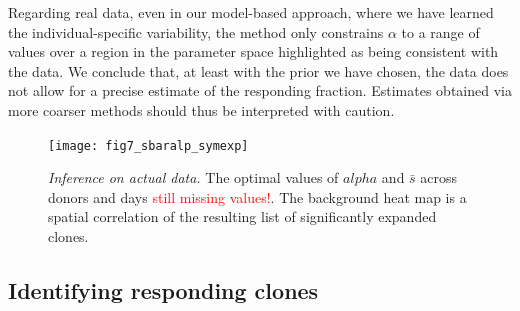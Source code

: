 \documentclass[letterpaper,english,prl,reprint,longbibliography]{revtex4-1} %
\newcommand{\re}[1]{\textcolor{red}{#1}}
\begin{document}
Regarding real data, even in our model-based approach, where we have learned the individual-specific variability, the method only constrains $\alpha$ to a range of values over a region in the parameter space highlighted as being consistent with the data. We conclude that, at least with the prior we have chosen, the data does not allow for a precise estimate of the responding fraction. Estimates obtained via more coarser methods should thus be interpreted with caution.



\begin{figure}[tbph!]
\texttt{[image: fig7\_sbaralp\_symexp]}
\centering{}
\caption{
\emph{Inference on actual data.} The optimal values of $alpha$ and $\bar{s}$ across donors and days \re{still missing values!}. The background heat map is a spatial correlation of the resulting list of significantly expanded clones. 
\label{fig:diffexpr_ex2}}
\end{figure}

% 

\subsection{Identifying responding clones} \label{sec:resp_clones}
\end{document}
